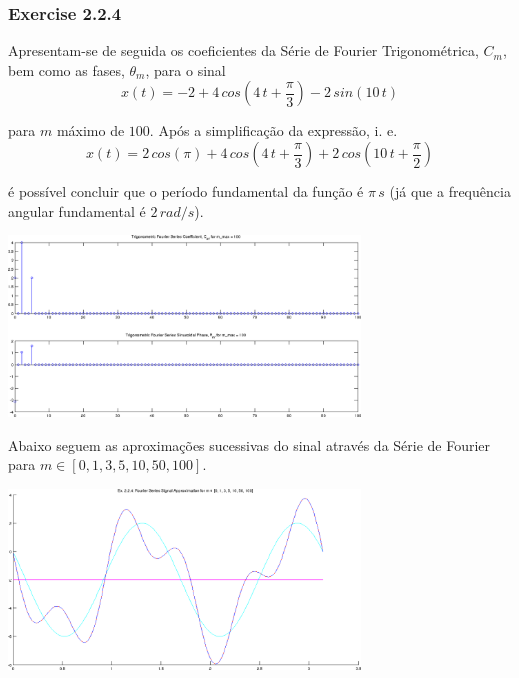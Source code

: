\documentclass[a4paper]{article}
\begin{document}
\subsubsection{Exercise 2.2.4}
\noindent Apresentam-se de seguida os coeficientes da Série de Fourier Trigonométrica, $C_m$, bem como as fases, $\theta_m$, para o sinal
\[
	x(t) = -2 + 4 \, cos\left(4 \, t + \frac{\pi}{3}\right) - 2 \, sin(10 \, t)
\]

\noindent para $m$ máximo de $100$. Após a simplificação da expressão, i. e.
\[
	x(t) = 2 \, cos(\pi) + 4 \, cos\left(4 \, t + \frac{\pi}{3}\right) + 2 \, cos\left(10 \, t + \frac{\pi}{2}\right)
\]

\noindent é possível concluir que o período fundamental da função é $\pi \, s$ (já que a frequência angular fundamental é $2 \, rad/s$).

\begin{center}
	\includegraphics[width=0.70\textwidth]{images/ex2_2_4_cm_tm.png}
	\label{fig:ex2_2_4_cm_tm}
\end{center}

\noindent Abaixo seguem as aproximações sucessivas do sinal através da Série de Fourier para $m \in [0, 1, 3, 5, 10, 50, 100]$.
\begin{center}
	\includegraphics[width=0.70\textwidth]{images/ex2_2_4_approx.png}
	\label{fig:ex2_2_4_approx}
\end{center}
\end{document}
